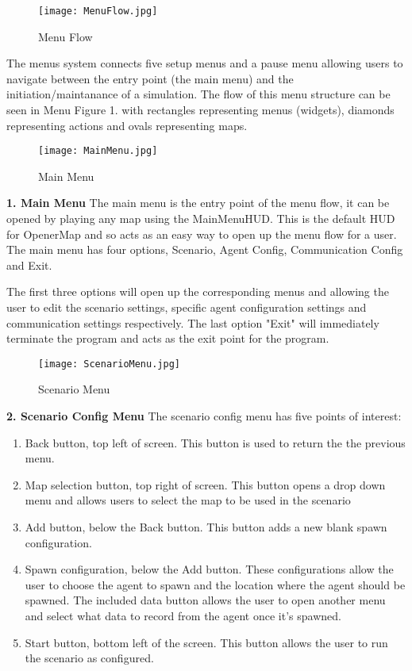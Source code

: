 \documentclass[../main.tex]{subfiles}
\begin{document}
\begin{figure}
\texttt{[image: MenuFlow.jpg]}
\caption{Menu Flow}
\end{figure}

The menus system connects five setup menus and a pause menu allowing users to navigate between the entry point (the main menu) and the initiation/maintanance of a simulation. The flow of this menu structure can be seen in Menu Figure 1. with rectangles representing menus (widgets), diamonds representing actions and ovals representing maps.

\begin{figure}
\texttt{[image: MainMenu.jpg]}
\caption{Main Menu}
\end{figure}

\break

\textbf{1. Main Menu}
The main menu is the entry point of the menu flow, it can be opened by playing any map using the MainMenuHUD. This is the default HUD for OpenerMap and so acts as an easy way to open up the menu flow for a user. The main menu has four options, Scenario, Agent Config, Communication Config and Exit. 

The first three options will open up the corresponding menus and allowing the user to edit the scenario settings, specific agent configuration settings and communication settings respectively. The last option "Exit" will immediately terminate the program and acts as the exit point for the program.

\break

\begin{figure}
\texttt{[image: ScenarioMenu.jpg]}
\caption{Scenario Menu}
\end{figure}

\textbf{2. Scenario Config Menu}
The scenario config menu has five points of interest:

\begin{enumerate}
\item Back button, top left of screen. This button is used to return the the previous menu.
\item Map selection button, top right of screen. This button opens a drop down menu and allows users to select the map to be used in the scenario
\item Add button, below the Back button. This button adds a new blank spawn configuration.
\item Spawn configuration, below the Add button. These configurations allow the user to choose the agent to spawn and the location where the agent should be spawned. The included data button allows the user to open another menu and select what data to record from the agent once it's spawned.
\item Start button, bottom left of the screen. This button allows the user to run the scenario as configured.
\end{enumerate}
\end{document}
